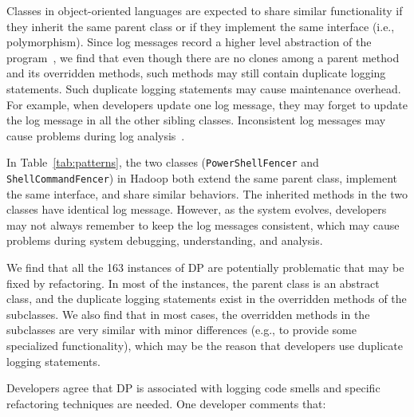 
Classes in object-oriented languages are expected to share similar functionality if they inherit the same parent class or if they implement the same interface (i.e., polymorphism). Since log messages record a higher level abstraction of the program~\cite{Shang:2014:ULL:2705615.2706065}, we find that even though there are no clones among a parent method and its overridden methods, such methods may still contain duplicate logging statements. Such duplicate logging statements may cause maintenance overhead. For example, when developers update one log message, they may forget to update the log message in all the other sibling classes. Inconsistent log messages may cause problems during log analysis~\cite{mehran_emse_2018, HADOOP-4190, logzip, loghub}.

 In Table~\ref{tab:patterns}, the two classes ({\tt\small PowerShellFencer} and {\tt\small ShellCommandFencer}) in Hadoop both extend the same parent class, implement the same interface, and share similar behaviors. The inherited methods in the two classes have identical log message. However, as the system evolves, developers may not always remember to keep the log messages consistent, which may cause problems during system debugging, understanding, and analysis.

 We find that all the 163 instances of DP are potentially problematic that may be fixed by refactoring. In most of the instances, the parent class is an abstract class, and the duplicate logging statements exist in the overridden methods of the subclasses. We also find that in most cases, the overridden methods in the subclasses are very similar with minor differences (e.g., to provide some specialized functionality), which may be the reason that developers use duplicate logging statements.

 Developers agree that DP is associated with logging code smells and specific refactoring techniques are needed. %
One developer comments that:



